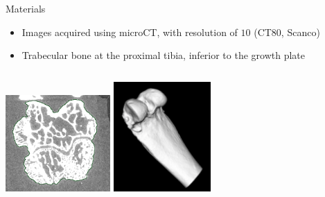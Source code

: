 \documentclass[10pt,aspectratio=169]{beamer}
\begin{document}
\begin{frame}[fragile]{Materials}
  \begin{itemize} \itemsep1em
    \item Images acquired using microCT, with resolution of $10$\si{\micro} (\si{\micro}CT80, Scanco)
    \item Trabecular bone at the proximal tibia, inferior to the growth plate
  \end{itemize}
  \vspace{0.5cm}
  \begin{columns}[onlytextwidth]
    \centering
    \includegraphics[width=4cm]{figures/bone_materials.png}
    \centering
    \includegraphics[width=3.7cm]{figures/bone_materials_3D.png}
  \end{columns}
\end{frame}
\end{document}
